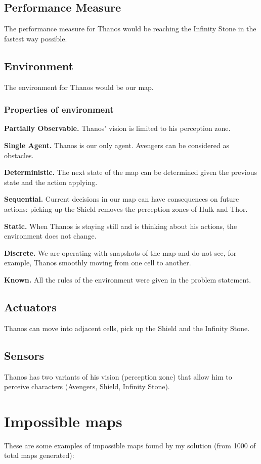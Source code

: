 \documentclass{article}
\begin{document}
\subsection{Performance Measure}
The performance measure for Thanos would be reaching the Infinity Stone in the fastest way possible.
\subsection{Environment}
The environment for Thanos would be our map.
\subsubsection{Properties of environment}
\textbf{Partially Observable.} Thanos' vision is limited to his perception zone.

\textbf{Single Agent.} Thanos is our only agent. Avengers can be considered as obstacles.

\textbf{Deterministic.} The next state of the map can be determined given the previous state and the action applying.

\textbf{Sequential.} Current decisions in our map can have consequences on future actions: picking up the Shield removes the perception zones of Hulk and Thor.

\textbf{Static.} When Thanos is staying still and is thinking about his actions, the environment does not change.

\textbf{Discrete.} We are operating with snapshots of the map and do not see, for example, Thanos smoothly moving from one cell to another.

\textbf{Known.} All the rules of the environment were given in the problem statement.
\subsection{Actuators}
Thanos can move into adjacent cells, pick up the Shield and the Infinity Stone.
\subsection{Sensors}
Thanos has two variants of his vision (perception zone) that allow him to perceive characters (Avengers, Shield, Infinity Stone).

\section{Impossible maps}
These are some examples of impossible maps found by my solution (from 1000 of total maps generated):
\end{document}
